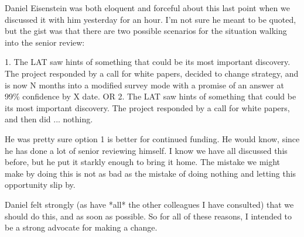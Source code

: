 \documentclass[aps,prd,superscriptaddress,showpacs,nofootinbib,fixlfloat, 12pt]{revtex4-1}
\begin{document}
Daniel Eisenstein was both eloquent and forceful about this last point
when we discussed it with him yesterday for an hour.  I'm not sure he
meant to be quoted, but the gist was that there are two possible
scenarios for the situation walking into the senior review:

1.  The LAT saw hints of something that could be its most important
discovery.  The project responded by a call for white papers, decided
to change strategy, and is now N months into a modified survey mode
with a promise of an answer at 99\% confidence by X date.
OR
2.  The LAT saw hints of something that could be its most important
discovery.  The project responded by a call for white papers, and then
did ... nothing.

He was pretty sure option 1 is better for continued funding.  He would
know, since he has done a lot of senior reviewing himself.  I know we
have all discussed this before, but he put it starkly enough to bring
it home.  The mistake we might make by doing this is not as bad as the
mistake of doing nothing and letting this opportunity slip by.

Daniel felt strongly (as have *all* the other colleagues I have
consulted) that we should do this, and as soon as possible.  So for
all of these reasons, I intended to be a strong advocate for making a
change.



\clearpage

\end{document}
